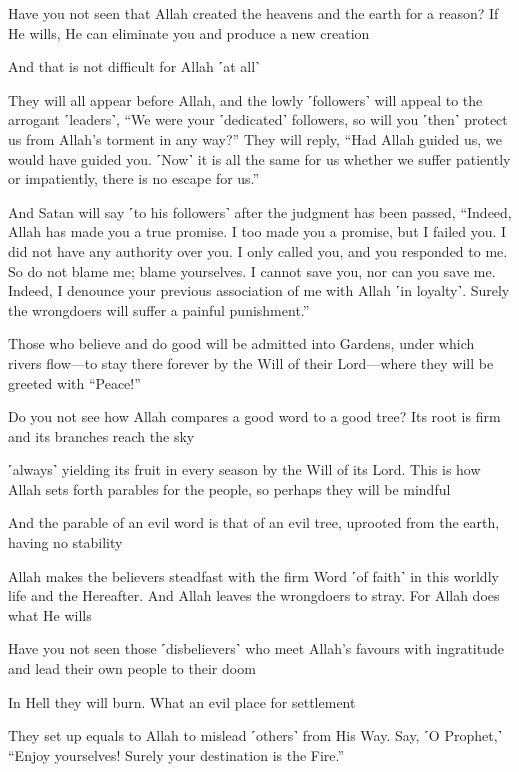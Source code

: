 Have you not seen that Allah created the heavens and the earth for a reason? If He wills, He can eliminate you and produce a new creation

And that is not difficult for Allah ˹at all˺

They will all appear before Allah, and the lowly ˹followers˺ will appeal to the arrogant ˹leaders˺, “We were your ˹dedicated˺ followers, so will you ˹then˺ protect us from Allah’s torment in any way?” They will reply, “Had Allah guided us, we would have guided you. ˹Now˺ it is all the same for us whether we suffer patiently or impatiently, there is no escape for us.”

And Satan will say ˹to his followers˺ after the judgment has been passed, “Indeed, Allah has made you a true promise. I too made you a promise, but I failed you. I did not have any authority over you. I only called you, and you responded to me. So do not blame me; blame yourselves. I cannot save you, nor can you save me. Indeed, I denounce your previous association of me with Allah ˹in loyalty˺. Surely the wrongdoers will suffer a painful punishment.”

Those who believe and do good will be admitted into Gardens, under which rivers flow—to stay there forever by the Will of their Lord—where they will be greeted with “Peace!”

Do you not see how Allah compares a good word to a good tree? Its root is firm and its branches reach the sky

˹always˺ yielding its fruit in every season by the Will of its Lord. This is how Allah sets forth parables for the people, so perhaps they will be mindful

And the parable of an evil word is that of an evil tree, uprooted from the earth, having no stability

Allah makes the believers steadfast with the firm Word ˹of faith˺ in this worldly life and the Hereafter. And Allah leaves the wrongdoers to stray. For Allah does what He wills

Have you not seen those ˹disbelievers˺ who meet Allah’s favours with ingratitude and lead their own people to their doom

In Hell they will burn. What an evil place for settlement

They set up equals to Allah to mislead ˹others˺ from His Way. Say, ˹O Prophet,˺ “Enjoy yourselves! Surely your destination is the Fire.”


